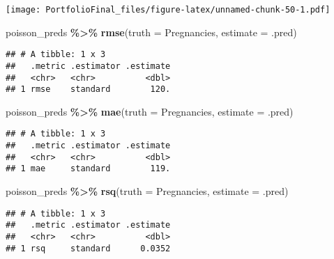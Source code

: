 \documentclass[
]{article}
\newenvironment{Shaded}{\begin{snugshade}}{\end{snugshade}}
\newcommand{\AttributeTok}[1]{\textcolor[rgb]{0.13,0.29,0.53}{#1}}
\newcommand{\FunctionTok}[1]{\textcolor[rgb]{0.13,0.29,0.53}{\textbf{#1}}}
\newcommand{\NormalTok}[1]{#1}
\newcommand{\SpecialCharTok}[1]{\textcolor[rgb]{0.81,0.36,0.00}{\textbf{#1}}}
\begin{document}
\texttt{[image: PortfolioFinal\_files/figure-latex/unnamed-chunk-50-1.pdf]}

\begin{Shaded}
\begin{Highlighting}[]
\NormalTok{poisson\_preds }\SpecialCharTok{\%\textgreater{}\%} \FunctionTok{rmse}\NormalTok{(}\AttributeTok{truth =}\NormalTok{ Pregnancies, }\AttributeTok{estimate =}\NormalTok{ .pred)}
\end{Highlighting}
\end{Shaded}

\begin{verbatim}
## # A tibble: 1 x 3
##   .metric .estimator .estimate
##   <chr>   <chr>          <dbl>
## 1 rmse    standard        120.
\end{verbatim}

\begin{Shaded}
\begin{Highlighting}[]
\NormalTok{poisson\_preds }\SpecialCharTok{\%\textgreater{}\%} \FunctionTok{mae}\NormalTok{(}\AttributeTok{truth =}\NormalTok{ Pregnancies, }\AttributeTok{estimate =}\NormalTok{ .pred)}
\end{Highlighting}
\end{Shaded}

\begin{verbatim}
## # A tibble: 1 x 3
##   .metric .estimator .estimate
##   <chr>   <chr>          <dbl>
## 1 mae     standard        119.
\end{verbatim}

\begin{Shaded}
\begin{Highlighting}[]
\NormalTok{poisson\_preds }\SpecialCharTok{\%\textgreater{}\%} \FunctionTok{rsq}\NormalTok{(}\AttributeTok{truth =}\NormalTok{ Pregnancies, }\AttributeTok{estimate =}\NormalTok{ .pred)}
\end{Highlighting}
\end{Shaded}

\begin{verbatim}
## # A tibble: 1 x 3
##   .metric .estimator .estimate
##   <chr>   <chr>          <dbl>
## 1 rsq     standard      0.0352
\end{verbatim}
\end{document}
